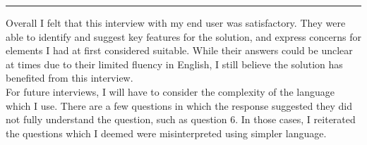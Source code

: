 \documentclass{article}
\begin{document}
\begin{center}
\rule{0.5\linewidth}{0.4pt}
\end{center}

Overall I felt that this interview with my end user was satisfactory. They were able to identify and suggest key features for the solution, and express concerns for elements I had at first considered suitable. While their answers could be unclear at times due to their limited fluency in English, I still believe the solution has benefited from this interview. \\

For future interviews, I will have to consider the complexity of the language which I use. There are a few questions in which the response suggested they did not fully understand the question, such as question 6. In those cases, I reiterated the questions which I deemed were misinterpreted using simpler language.
\end{document}
